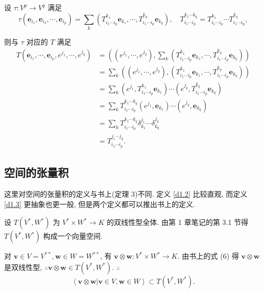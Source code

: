 \documentclass[color=black,device=normal,lang=cn,mode=geye]{elegantnote}
\begin{document}
设 $\tau:V^p\to V^q$ 满足
\[\tau(\boldsymbol{e}_{i_1},\boldsymbol{e}_{i_2},\cdots,\boldsymbol{e}_{i_p})=\sum\limits_k(T_{i_1\cdots i_p}^{k_1}\boldsymbol{e}_{k_1},\cdots,T_{i_1\cdots i_p}^{k_q}\boldsymbol{e}_{k_q}),\quad T_{i_1\cdots i_p}^{k_1\cdots k_q}=T_{i_1\cdots i_p}^{k_1}\cdots T_{i_1\cdots i_p}^{k_q},\]

则与 $\tau$ 对应的 $T$ 满足
\begin{align*}
    T(\boldsymbol{e}_{i_1},\cdots,\boldsymbol{e}_{i_p},e^{j_1},\cdots,e^{j_q}) & =\left((e^{j_1},\cdots,e^{j_q}),\sum\limits_k(T_{i_1\cdots i_p}^{k_1}\boldsymbol{e}_{k_1},\cdots,T_{i_1\cdots i_p}^{k_q}\boldsymbol{e}_{k_q})\right) \\
    & =\sum\limits_k((e^{j_1},\cdots,e^{j_q}),(T_{i_1\cdots i_p}^{k_1}\boldsymbol{e}_{k_1},\cdots,T_{i_1\cdots i_p}^{k_q}\boldsymbol{e}_{k_q})) \\
    & =\sum\limits_k(e^{j_1},T_{i_1\cdots i_p}^{k_1}\boldsymbol{e}_{k_1})\cdots(e^{j_q},T_{i_1\cdots i_p}^{k_q}\boldsymbol{e}_{k_q}) \\
    & =\sum\limits_kT_{i_1\cdots i_p}^{k_1\cdots k_q}(e^{j_1},\boldsymbol{e}_{k_1})\cdots(e^{j_q},\boldsymbol{e}_{k_q}) \\
    & =\sum\limits_kT_{i_1\cdots i_p}^{k_1\cdots k_q}\delta_{k_1}^{j_1}\cdots\delta_{k_q}^{j_q} \\
    & =T_{i_1\cdots i_p}^{j_1\cdots j_q}.
\end{align*}
\subsection{空间的张量积}
这里对空间的张量积的定义与书上(定理 3)不同. 定义 \ref{d1.2} 比较直观, 而定义 \ref{d1.3} 更抽象也更一般, 但是两个定义都可以推出书上的定义.

设 $T(V^*,W^*)$ 为 $V^*\times W^*\to K$ 的双线性型全体. 由第 1 章笔记的第 3.1 节得 $T(V^*,W^*)$ 构成一个向量空间.

对 $\boldsymbol{v}\in V=V^{**},\boldsymbol{w}\in W=W^{**}$, 有 $\boldsymbol{v}\otimes\boldsymbol{w}:V^*\times W^*\to K$. 由书上的式 (6) 得 $\boldsymbol{v}\otimes\boldsymbol{w}$ 是双线性型, $\therefore\boldsymbol{v}\otimes\boldsymbol{w}\in T(V^*,W^*)$. $\therefore$
\[\left<\boldsymbol{v}\otimes\boldsymbol{w}|\boldsymbol{v}\in V,\boldsymbol{w}\in W\right>\subset T(V^*,W^*).\]
\end{document}
